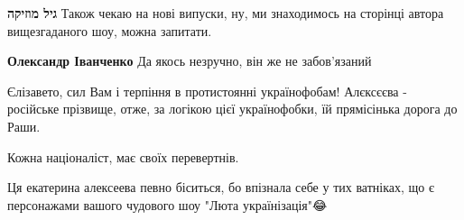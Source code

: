 \begin{itemize}
\begin{itemize}
\begin{itemize}
 
\textbf{גיל מוזיקה} Також чекаю на нові випуски, ну, ми знаходимось на сторінці автора вищезгаданого шоу, можна запитати.

 
\textbf{Олександр Іванченко}
Да якось незручно, він же не забов'язаний
\end{itemize}
\end{itemize}

 
Єлізавето, сил Вам і терпіння в протистоянні українофобам!
Алєксєєва - російське прізвище, отже, за логікою цієї українофобки, їй прямісінька дорога до Раши.

 
Кожна націоналіст, має своїх перевертнів.

 
Ця екатерина алексеева певно біситься, бо впізнала себе у тих ватніках, що є персонажами вашого чудового шоу "Люта українізація"😂

 

\end{itemize}

